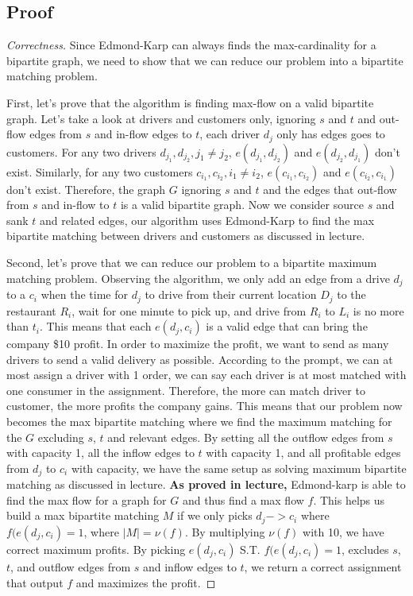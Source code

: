\documentclass[openany]{article}
\begin{document}
\subsection*{Proof}
\begin{proof}[Correctness]{}
    Since Edmond-Karp can always finds the max-cardinality for a bipartite graph, we need to show that we can reduce our problem into a bipartite matching problem. 

    First, let's prove that the algorithm is finding max-flow on a valid bipartite graph. Let's take a look at drivers and customers only, ignoring $s$ and $t$ and out-flow edges from $s$ and in-flow edges to $t$, each driver $d_j$ only has edges goes to customers. For any two drivers $d_{j_1}, d_{j_2}, j_1 \neq j_2$, $e(d_{j_1}, d_{j_2})$ and $e(d_{j_2}, d_{j_1})$ don't exist. Similarly, for any two customers $c_{i_1}, c_{i_2}, i_1 \neq i_2$, $e(c_{i_1}, c_{i_2})$ and $e(c_{i_2}, c_{i_1})$ don't exist. Therefore, the graph $G$ ignoring $s$ and $t$ and the edges that out-flow from $s$ and in-flow to $t$ is a valid bipartite graph. Now we consider source $s$ and sank $t$ and related edges, our algorithm uses Edmond-Karp to find the max bipartite matching between drivers and customers as discussed in lecture.

    Second, let's prove that we can reduce our problem to a bipartite maximum matching problem. Observing the algorithm, we only add an edge from a drive $d_j$ to a $c_i$ when the time for $d_j$ to drive from their current location $D_j$ to the restaurant $R_i$, wait for one minute to pick up, and drive from $R_i$ to $L_i$ is no more than $t_i$. This means that each $e(d_j, c_i)$ is a valid edge that can bring the company \$10 profit. In order to maximize the profit, we want to send as many drivers to send a valid delivery as possible. According to the prompt, we can at most assign a driver with 1 order, we can say each driver is at most matched with one consumer in the assignment. Therefore, the more can match driver to customer, the more profits the company gains. This means that our problem now becomes the max bipartite matching where we find the maximum matching for the $G$ excluding $s$, $t$ and relevant edges. By setting all the outflow edges from $s$ with capacity 1, all the inflow edges to $t$ with capacity 1, and all profitable edges from $d_j$ to $c_i$ with capacity, we have the same setup as solving maximum bipartite matching as discussed in lecture. \textbf{As proved in lecture,} Edmond-karp is able to find the max flow for a graph for $G$ and thus find a max flow $f$. This helps us build a max bipartite matching $M$ if we only picks $d_j -> c_i$ where $f(e(d_j,c_i) = 1$, where $|M| = \nu(f).$ By multiplying $\nu(f)$ with 10, we have correct maximum profits. By picking $e(d_j,c_i)$ S.T. $f(e(d_j,c_i) = 1$, excludes $s$, $t$, and outflow edges from $s$ and inflow edges to $t$, we return a correct assignment that output $f$ and maximizes the profit.
\end{proof}
\end{document}
